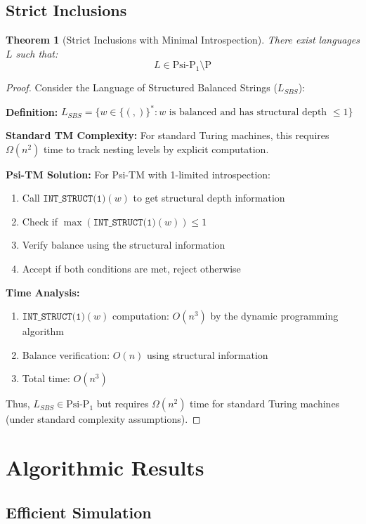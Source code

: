 \documentclass[11pt]{article}
\newtheorem{theorem}{Theorem}
\begin{document}
\subsection{Strict Inclusions}

\begin{theorem}[Strict Inclusions with Minimal Introspection]
There exist languages $L$ such that:
$$L \in \text{Psi-P}_1 \setminus \text{P}$$
\end{theorem}

\begin{proof}
Consider the Language of Structured Balanced Strings ($L_{SBS}$):

\textbf{Definition:} $L_{SBS} = \{w \in \{(,)\}^* : w \text{ is balanced and has structural depth } \leq 1\}$

\textbf{Standard TM Complexity:}
For standard Turing machines, this requires $\Omega(n^2)$ time to track nesting levels by explicit computation.

\textbf{Psi-TM Solution:}
For Psi-TM with 1-limited introspection:
\begin{enumerate}
\item Call $\texttt{INT\_STRUCT(1)}(w)$ to get structural depth information
\item Check if $\max(\texttt{INT\_STRUCT(1)}(w)) \leq 1$
\item Verify balance using the structural information
\item Accept if both conditions are met, reject otherwise
\end{enumerate}

\textbf{Time Analysis:}
\begin{enumerate}
\item $\texttt{INT\_STRUCT(1)}(w)$ computation: $O(n^3)$ by the dynamic programming algorithm
\item Balance verification: $O(n)$ using structural information
\item Total time: $O(n^3)$
\end{enumerate}

Thus, $L_{SBS} \in \text{Psi-P}_1$ but requires $\Omega(n^2)$ time for standard Turing machines (under standard complexity assumptions).
\end{proof}

\section{Algorithmic Results}

\subsection{Efficient Simulation}
\end{document}
